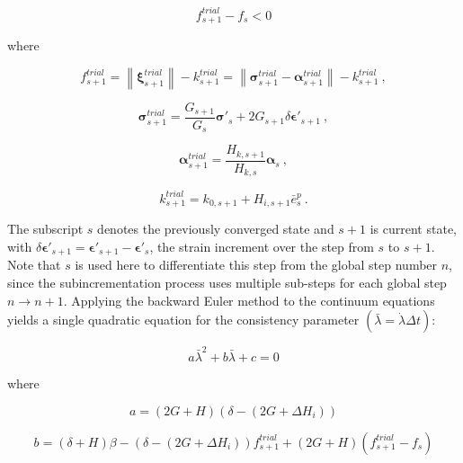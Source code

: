\documentclass[11pt]{report}
\numberwithin{equation}{section}
\newcommand{\bmf } {\boldsymbol }
\begin{document}
\begin{equation}
f_{s+1}^{trial} - f_s < 0
\end{equation}

\noindent where

\begin{equation}
f_{s+1}^{trial} = \left\| \bmf{\xi}_{s+1}^{trial} \right\| - k_{s+1}^{trial} = \left\| \bmf{\sigma}_{s+1}^{trial} - \bmf{\alpha}_{s+1}^{trial} \right\| - k_{s+1}^{trial}~,
\end{equation}

\begin{equation}
\bmf{\sigma}_{s+1}^{trial} = \dfrac{G_{s+1}}{G_s}\bmf{\sigma}'_s + 2 G_{s+1} \delta  \bmf{\epsilon}'_{s + 1}~,
\end{equation}

\begin{equation}
\bmf{\alpha}_{s+1}^{trial} = \dfrac{H_{k,s+1}}{H_{k,s}} \bmf{\alpha}_s~,
\end{equation}

\begin{equation}
k_{s+1}^{trial} = k_{0,s+1} + H_{i,s+1} \bar e^p_{s} ~.
\end{equation}

The subscript $s$ denotes the previously converged state and $s+1$ is current state, 
with $\delta \bmf \epsilon'_{s+1} = \bmf \epsilon'_{s+1}-\bmf \epsilon'_s$, the strain 
increment over the step from $s$ to $s+1$. Note that $s$ is 
used here to differentiate this step from the global step number $n$, since 
the subincrementation process uses multiple sub-steps for each global 
step $n \rightarrow n+1$.
Applying the backward Euler method to the continuum equations 
yields a single quadratic equation for the consistency 
parameter $\left( \bar \lambda = \dot \lambda \Delta t \right)$:

\begin{equation}
a{\bar \lambda ^2} + b\bar \lambda  + c = 0
\end{equation}

\noindent where

\begin{equation}\label{E:gp_a}
a = \left( {2G + H} \right)\left( { \delta  - \left( 2G + \Delta H_i \right) } \right)
\end{equation}

\begin{equation}\label{E:gp_b}
b = \left( {\delta  +  H} \right)\beta 
 - \left( {\delta  - \left( 2G + \Delta H_i \right)} \right) f_{s+1}^{trial}
+ \left( {2G + H} \right)\left( f_{s+1}^{trial} - f_s \right)
\end{equation}
\end{document}
